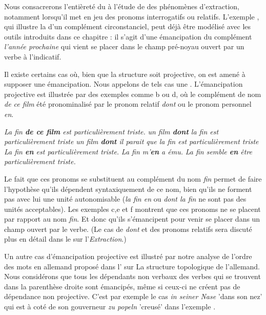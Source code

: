 Nous consacrerons l’entièreté du  à l’étude de des phénomènes d'extraction, notamment lorsqu’il met en jeu des pronoms interrogatifs ou relatifs. L'exemple , qui illustre la  d’un complément circonstanciel, peut déjà être modélisé avec les outils introduits dans ce chapitre : il s’agit d’une émancipation du complément \textit{l'année prochaine} qui vient se placer dans le champ pré-noyau ouvert par un verbe à l’indicatif. 

{\label{sec:3.5.A}
Il existe certains cas où, bien que la structure soit projective, on est amené à supposer une émancipation. Nous appelons de tels cas une . L'émancipation projective est illustrée par des exemples comme b ou d, où le complément de nom \textit{de ce film} été pronominalisé par le pronom relatif \textit{dont} ou le pronom personnel \textit{en}.

\ea\label{ex:en}
\ea \textit{La fin \textbf{de ce film} est particulièrement triste.}
\ex \textit{un film \textbf{dont} la fin est particulièrement triste}
\ex \textit{un film \textbf{dont} il parait que la fin est particulièrement triste}
\ex \textit{La fin \textbf{en} est particulièrement triste.}
\ex \textit{La fin m'\textbf{en} a ému.}
\ex \textit{La fin semble \textbf{en} être particulièrement triste.}
\z\z

Le fait que ces pronoms se substituent au complément du nom \textit{fin} permet de faire l'hypothèse qu'ils dépendent syntaxiquement de ce nom, bien qu'ils ne forment pas avec lui une unité autonomisable (\textit{la fin en} ou \textit{dont la fin} ne sont pas des unités acceptables). Les exemples c,e et f montrent que ces pronoms ne se placent par rapport au nom \textit{fin}. Et donc qu'ils s'émancipent pour venir se placer dans un champ ouvert par le verbe. (Le cas de \textit{dont} et des pronoms relatifs sera discuté plus en détail dans le  sur l'\textit{Extraction}.)

Un autre cas d'émancipation projective est illustré par notre analyse de l'ordre des mots en allemand proposé dans l' sur {La structure topologique de l’allemand}. Nous considérons que tous les dépendants non verbaux des verbes qui se trouvent dans la parenthèse droite sont émancipés, même si ceux-ci ne créent pas de dépendance non projective. C'est par exemple le cas \textit{in seiner Nase} 'dans son nez' qui est à coté de son gouverneur \textit{zu popeln} 'creusé' dans l'exemple .
}

